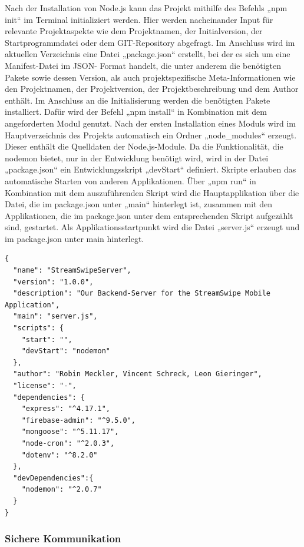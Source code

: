\noindent
Nach der Installation von Node.js kann das Projekt mithilfe des Befehls „npm init“ im Terminal initializiert werden. 
Hier werden nacheinander Input für relevante Projektaspekte wie dem Projektnamen, der Initialversion, der Startprogrammdatei oder dem GIT-Repository abgefragt.  
Im Anschluss wird im aktuellen Verzeichnis eine Datei „package.json“ erstellt,  bei der es sich um eine Manifest-Datei im JSON- Format handelt, die unter anderem die benötigten Pakete sowie dessen Version, als auch projektspezifische Meta-Informationen wie den Projektnamen, der Projektversion, der Projektbeschreibung und dem Author enthält.
\newline
Im Anschluss an die Initialisierung werden die benötigten Pakete installiert. Dafür wird der Befehl „npm install“ in Kombination mit dem angeforderten Modul genutzt. 
Nach der ersten Installation eines Moduls wird im Hauptverzeichnis des Projekts automatisch ein Ordner „node\_modules“ erzeugt. Dieser enthält die Quelldaten der Node.js-Module. 
\newline
Da die Funktionalität, die nodemon bietet, nur in der Entwicklung benötigt wird, wird in der Datei „package.json“ ein Entwicklungsskript „devStart“ definiert. 
Skripte erlauben das automatische Starten von anderen Applikationen. Über „npm run“ in Kombination mit dem auszuführenden Skript wird die Hauptapplikation über die Datei, die im package.json unter „main“ hinterlegt ist, zusammen mit den Applikationen, die im package.json unter dem entsprechenden Skript aufgezählt sind, gestartet.
\newline
Als Applikationsstartpunkt wird die Datei „server.js“ erzeugt und im package.json unter main hinterlegt. 

\begin{lstlisting}[caption=Datei package.json, label=lst:packagejson]
{
  "name": "StreamSwipeServer",
  "version": "1.0.0",
  "description": "Our Backend-Server for the StreamSwipe Mobile Application",
  "main": "server.js",
  "scripts": {
    "start": "",
    "devStart": "nodemon"
  },
  "author": "Robin Meckler, Vincent Schreck, Leon Gieringer",
  "license": "-",
  "dependencies": {
    "express": "^4.17.1",
    "firebase-admin": "^9.5.0",
    "mongoose": "^5.11.17",
    "node-cron": "^2.0.3",
    "dotenv": "^8.2.0"
  },
  "devDependencies":{
    "nodemon": "^2.0.7"
  }
}
\end{lstlisting}

\subsubsection{Sichere Kommunikation}

